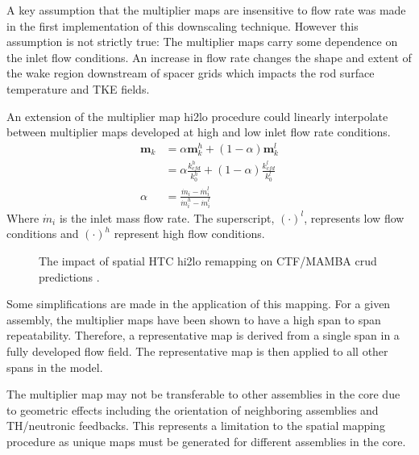 A key assumption that the multiplier maps are insensitive to flow rate was made in the first implementation of this downscaling technique.  However this assumption is not strictly true: The multiplier maps carry some dependence on the inlet flow conditions.  An increase in flow rate changes the shape and extent of the wake region downstream of spacer grids which impacts the rod surface temperature and TKE fields.

    An extension of the multiplier map hi2lo procedure could linearly interpolate between multiplier maps developed at high and low inlet flow rate conditions.
    \begin{align*}
        \mathbf m_k &= \alpha \mathbf m_k^h + (1 - \alpha) \mathbf m_k^l \\
                    &= \alpha \frac{k^h_{cfd}}{k^h_0} + (1 - \alpha) \frac{k^l_{cfd}}{k^l_0} \\
        \alpha & = \frac{\dot m_i - \dot m_i^l }{\dot m_i^h - \dot m_i^l}
    \end{align*}
    Where $\dot m_i$ is the inlet mass flow rate.  The superscript, $(\cdot)^l$, represents low flow conditions and $(\cdot)^h$ represent high flow conditions.


\begin{figure}[H]%
    \centering
    \qquad
    \caption[The impact of spatial HTC hi2lo remapping on CTF/MAMBA crud predictions.]{The impact of spatial HTC hi2lo remapping on CTF/MAMBA crud predictions \cite{salko17}.}%
    \label{fig:htc_remap_crud}%
\end{figure}


Some simplifications are made in the application of this mapping.  For a given assembly, the multiplier maps have been shown to have a high span to span repeatability.  Therefore, a representative map is derived from a single span in a fully developed flow field.  The representative map is then applied to all other spans in the model.

The multiplier map may not be transferable to other assemblies in the core due to geometric effects including the orientation of neighboring assemblies and TH/neutronic feedbacks.  This represents a limitation to the spatial mapping procedure as unique maps must be generated for different assemblies in the core.


